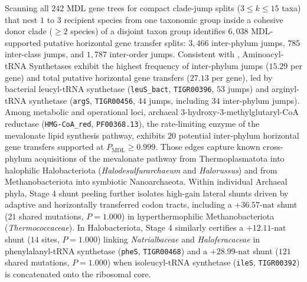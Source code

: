 \documentclass[11pt,a4paper]{article}
\begin{document}
Scanning all $242$ MDL gene trees for compact clade-jump splits ($3 \le k \le 15$ taxa) that nest $1$ to $3$ recipient species from one taxonomic group inside a cohesive donor clade ($\ge 2$ species) of a disjoint taxon group identifies $6,038$ MDL-supported putative horizontal gene transfer splits: $3,466$ inter-phylum jumps, $785$ inter-class jumps, and $1,787$ inter-order jumps. Consistent with \citet{woese2000aminoacyl}, Aminoacyl-tRNA Synthetases exhibit the highest frequency of inter-phylum jumps ($15.29$ per gene) and total putative horizontal gene transfers ($27.13$ per gene), led by bacterial leucyl-tRNA synthetase (\texttt{leuS\_bact}, \texttt{TIGR00396}, $53$ jumps) and arginyl-tRNA synthetase (\texttt{argS}, \texttt{TIGR00456}, $44$ jumps, including $34$ inter-phylum jumps). Among metabolic and operational loci, archaeal 3-hydroxy-3-methylglutaryl-CoA reductase (\texttt{HMG-CoA\_red}, \texttt{PF00368.13}), the rate-limiting enzyme of the mevalonate lipid synthesis pathway, exhibits $20$ potential inter-phylum horizontal gene transfers supported at $P_{\text{MDL}} \ge 0.999$. Those edges capture known cross-phylum acquisitions of the mevalonate pathway from Thermoplasmatota into halophilic Halobacteriota (\textit{Halodesulfurarchaeum} and \textit{Halorussus}) and from Methanobacteriota into symbiotic Nanoarchaeota. Within individual Archaeal phyla, Stage 4 shunt peeling further isolates high-gain lateral shunts driven by adaptive and horizontally transferred codon tracts, including a $+36.57\text{-nat}$ shunt ($21$ shared mutations, $P = 1.000$) in hyperthermophilic Methanobacteriota (\textit{Thermococcaceae}). In Halobacteriota, Stage 4 similarly certifies a $+12.11\text{-nat}$ shunt ($14$ sites, $P = 1.000$) linking \textit{Natrialbaceae} and \textit{Haloferacaceae} in phenylalanyl-tRNA synthetase (\texttt{pheS}, \texttt{TIGR00468}) and a $+28.99\text{-nat}$ shunt ($121$ shared mutations, $P = 1.000$) when isoleucyl-tRNA synthetase (\texttt{ileS}, \texttt{TIGR00392}) is concatenated onto the ribosomal core.
\end{document}
